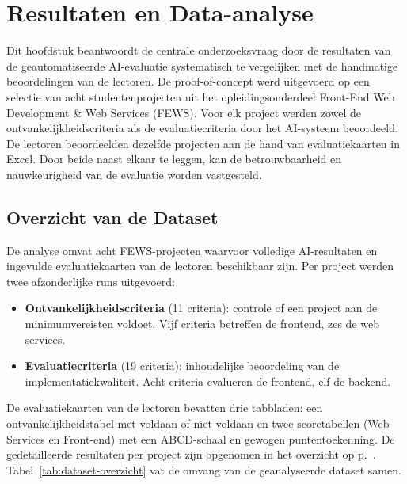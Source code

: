 \chapter{Resultaten en Data-analyse}%
\label{ch:evaluatie}

Dit hoofdstuk beantwoordt de centrale onderzoeksvraag door de resultaten van de geautomatiseerde AI-evaluatie systematisch te vergelijken met de handmatige beoordelingen van de lectoren. De proof-of-concept werd uitgevoerd op een selectie van acht studentenprojecten uit het opleidingsonderdeel Front-End Web Development \& Web Services (FEWS). Voor elk project werden zowel de ontvankelijkheidscriteria als de evaluatiecriteria door het AI-systeem beoordeeld. De lectoren beoordeelden dezelfde projecten aan de hand van evaluatiekaarten in Excel. Door beide naast elkaar te leggen, kan de betrouwbaarheid en nauwkeurigheid van de evaluatie worden vastgesteld.

\section{Overzicht van de Dataset}
\label{sec:dataset}

De analyse omvat acht FEWS-projecten waarvoor volledige AI-resultaten en ingevulde evaluatiekaarten van de lectoren beschikbaar zijn. Per project werden twee afzonderlijke runs uitgevoerd:

\begin{itemize}
    \item \textbf{Ontvankelijkheidscriteria} (11 criteria): controle of een project aan de minimumvereisten voldoet. Vijf criteria betreffen de frontend, zes de web services.
    \item \textbf{Evaluatiecriteria} (19 criteria): inhoudelijke beoordeling van de implementatiekwaliteit. Acht criteria evalueren de frontend, elf de backend.
\end{itemize}

De evaluatiekaarten van de lectoren bevatten drie tabbladen: een ontvankelijkheidstabel met voldaan of niet voldaan en twee scoretabellen (Web Services en Front-end) met een ABCD-schaal en gewogen puntentoekenning. De gedetailleerde resultaten per project zijn opgenomen in het overzicht op p.~\pageref{tab:dataset-overzicht}. Tabel~\ref{tab:dataset-overzicht} vat de omvang van de geanalyseerde dataset samen.

